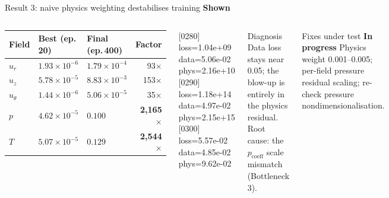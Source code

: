 \documentclass[aspectratio=169]{beamer}
\newcommand{\shown}{\textcolor{okgreen}{\textbf{Shown}}}
\newcommand{\pending}{\textcolor{warnorange}{\textbf{In progress}}}
\begin{document}
\begin{frame}{Result 3: naive physics weighting destabilises training \shown}
\begin{columns}[T,onlytextwidth]
\begin{center}
\small
\begin{tabular}{lllr}
\toprule
Field & Best (ep.\,20) & Final (ep.\,400) & Factor \\
\midrule
$u_r$ & $1.93\times10^{-6}$ & $1.79\times10^{-4}$ & 93$\times$ \\
$u_z$ & $5.78\times10^{-5}$ & $8.83\times10^{-3}$ & 153$\times$ \\
$u_\theta$ & $1.44\times10^{-6}$ & $5.06\times10^{-5}$ & 35$\times$ \\
$p$ & $4.62\times10^{-5}$ & $0.100$ & \textbf{2,165$\times$} \\
$T$ & $5.07\times10^{-5}$ & $0.129$ & \textbf{2,544$\times$} \\
\bottomrule
\end{tabular}
\end{center}
{\scriptsize\ttfamily
{[0280]} loss=1.04e+09 data=5.06e-02 phys=2.16e+10\\
{[0290]} loss=1.18e+14 data=4.97e-02 phys=2.15e+15\\
{[0300]} loss=5.57e-02 data=4.85e-02 phys=9.62e-02}
\begin{alertblock}{Diagnosis}
\small Data loss stays near 0.05; the blow-up is entirely in the physics residual. Root cause: the $p_{\mathrm{coeff}}$ scale mismatch (Bottleneck 3).
\end{alertblock}
\begin{exampleblock}{Fixes under test \pending}
\small Physics weight 0.001--0.005; per-field pressure residual scaling; re-check pressure nondimensionalisation.
\end{exampleblock}
\end{columns}
\end{frame}
\end{document}
